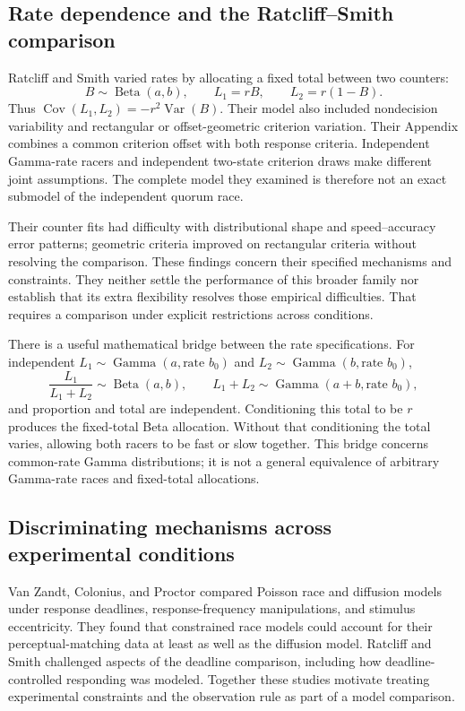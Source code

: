 \documentclass[12pt]{article}
\newcommand{\BetaDist}{\operatorname{Beta}}
\newcommand{\GammaDist}{\operatorname{Gamma}}
\newcommand{\Var}{\operatorname{Var}}
\theoremstyle{definition}
\theoremstyle{plain}
\theoremstyle{remark}
\begin{document}
\subsection{Rate dependence and the Ratcliff--Smith comparison}
Ratcliff and Smith \cite{RatcliffSmith2004} varied rates by allocating a fixed total between two counters:
\begin{equation}
 B\sim\BetaDist(a,b),\qquad L_1=rB,\qquad L_2=r(1-B).
\end{equation}
Thus $\operatorname{Cov}(L_1,L_2)=-r^2\Var(B)$. Their model also included nondecision variability and rectangular or offset-geometric criterion variation. Their Appendix combines a common criterion offset with both response criteria. Independent Gamma-rate racers and independent two-state criterion draws make different joint assumptions. The complete model they examined is therefore not an exact submodel of the independent quorum race.

Their counter fits had difficulty with distributional shape and speed--accuracy error patterns; geometric criteria improved on rectangular criteria without resolving the comparison. These findings concern their specified mechanisms and constraints. They neither settle the performance of this broader family nor establish that its extra flexibility resolves those empirical difficulties. That requires a comparison under explicit restrictions across conditions.

There is a useful mathematical bridge between the rate specifications. For independent $L_1\sim\GammaDist(a,\text{rate }b_0)$ and $L_2\sim\GammaDist(b,\text{rate }b_0)$,
\begin{equation}
 \frac{L_1}{L_1+L_2}\sim\BetaDist(a,b),\qquad
 L_1+L_2\sim\GammaDist(a+b,\text{rate }b_0),
\end{equation}
and proportion and total are independent. Conditioning this total to be $r$ produces the fixed-total Beta allocation. Without that conditioning the total varies, allowing both racers to be fast or slow together. This bridge concerns common-rate Gamma distributions; it is not a general equivalence of arbitrary Gamma-rate races and fixed-total allocations.

\subsection{Discriminating mechanisms across experimental conditions}
Van Zandt, Colonius, and Proctor \cite{VanZandtColoniusProctor2000} compared Poisson race and diffusion models under response deadlines, response-frequency manipulations, and stimulus eccentricity. They found that constrained race models could account for their perceptual-matching data at least as well as the diffusion model. Ratcliff and Smith \cite{RatcliffSmith2004} challenged aspects of the deadline comparison, including how deadline-controlled responding was modeled. Together these studies motivate treating experimental constraints and the observation rule as part of a model comparison.
\end{document}
